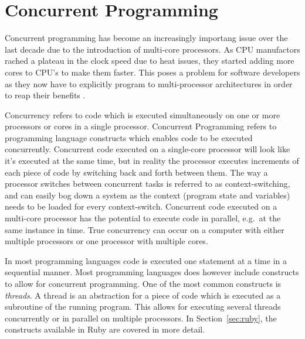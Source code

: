 \section{Concurrent Programming} %
\label{sec:concurrent}
Concurrent programming has become an increasingly importang issue over the
last decade due to the introduction of multi-core processors. As CPU
manufactors rached a plateau in the clock speed due to heat issues, they
started adding more cores to CPU's to make them faster. This poses a problem
for software developers as they now have to explicitly program to
multi-processor architectures in order to reap their benefits \cite{fund}.

Concurrency refers to code which is executed simultaneously on one or more
processors or cores in a single processor. Concurrent Programming refers to
programming language constructs which enables code to be executed concurrently.
Concurrent code executed on a single-core processor will look like it's executed
at the same time, but in reality the processor executes increments of each piece
of code by switching back and forth between them. The way a processor switches
between concurrent tasks is referred to as context-switching, and can easily bog
down a system as the context (program state and variables) needs to be loaded
for every context-switch.  Concurrent code executed on a multi-core processor
has the potential to execute code in parallel, e.g.\ at the same instance in
time. True concurrency can occur on a computer with either multiple processors
or one processor with multiple cores.

In most programming languages code is executed one statement at a time in a
sequential manner. Most programming languages does however include constructs
to allow for concurrent programming.  One of the most common constructs is
\textit{threads}. A thread is an abstraction for a piece of code which is
executed as a subroutine of the running program. This allows for executing
several threads concurrently or in parallel on multiple processors.  In
Section~\ref{sec:ruby}, the constructs available in Ruby are covered in more
detail.

